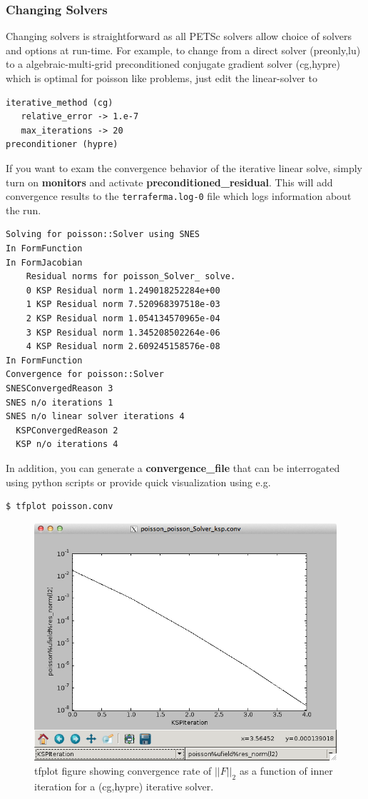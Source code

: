 \subsubsection{Changing Solvers}
\label{sec:changing-solvers}

Changing solvers is straightforward as all PETSc solvers
allow choice of solvers and options at run-time.  For example, to
change from a direct solver (preonly,lu) to a algebraic-multi-grid
preconditioned conjugate gradient solver (cg,hypre) which is optimal
for poisson like problems, just edit the linear-solver to
\begin{lstlisting}[style=Bash]
iterative_method (cg)
   relative_error -> 1.e-7
   max_iterations -> 20
preconditioner (hypre)
\end{lstlisting}
If you want to exam the convergence behavior of the iterative linear
solve, simply turn on \textbf{monitors} and activate
\textbf{preconditioned\_residual}.  This will add convergence results
to the \texttt{terraferma.log-0} file which logs information about the run.
\begin{lstlisting}[style=Bash]
Solving for poisson::Solver using SNES
In FormFunction
In FormJacobian
    Residual norms for poisson_Solver_ solve.
    0 KSP Residual norm 1.249018252284e+00 
    1 KSP Residual norm 7.520968397518e-03 
    2 KSP Residual norm 1.054134570965e-04 
    3 KSP Residual norm 1.345208502264e-06 
    4 KSP Residual norm 2.609245158576e-08 
In FormFunction
Convergence for poisson::Solver
SNESConvergedReason 3
SNES n/o iterations 1
SNES n/o linear solver iterations 4
  KSPConvergedReason 2
  KSP n/o iterations 4
\end{lstlisting}
In addition, you can generate a \textbf{convergence\_file} that can be
interrogated using python scripts or provide quick visualization using
e.g.
\begin{lstlisting}[style=Bash]
$ tfplot poisson.conv
\end{lstlisting} %
\begin{figure}[b!]
  \centering
  \includegraphics[width=.7\textwidth]{figures/screendumps/tfplot_cg-hypre-residuals.png}
  \caption{tfplot figure showing convergence rate of $||F||_2$ as a function of inner iteration for a (cg,hypre) iterative solver.}
  \label{fig:tfplot-convergence-poisson}
\end{figure}

